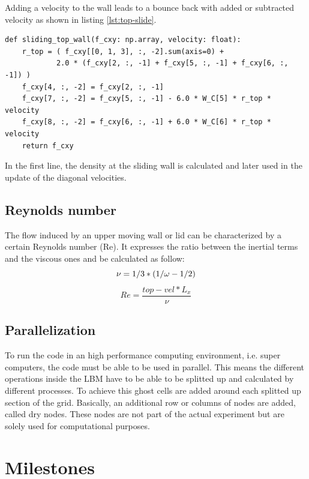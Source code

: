 \documentclass[a4paper,11pt, oneside]{book}
\begin{document}
Adding a velocity to the wall leads to a bounce back with added or subtracted velocity as shown in listing \ref{lst:top-slide}. 
\begin{center}
  \begin{lstlisting}[caption=Bounce back at the top sliding wall.,label=lst:top-slide, basicstyle=\small]
def sliding_top_wall(f_cxy: np.array, velocity: float):
    r_top = ( f_cxy[[0, 1, 3], :, -2].sum(axis=0) + 
            2.0 * (f_cxy[2, :, -1] + f_cxy[5, :, -1] + f_cxy[6, :, -1]) )
    f_cxy[4, :, -2] = f_cxy[2, :, -1]
    f_cxy[7, :, -2] = f_cxy[5, :, -1] - 6.0 * W_C[5] * r_top * velocity
    f_cxy[8, :, -2] = f_cxy[6, :, -1] + 6.0 * W_C[6] * r_top * velocity
    return f_cxy
  \end{lstlisting}
\end{center}
In the first line, the density at the sliding wall is calculated and later used in the update of the diagonal velocities.

\section{Reynolds number}
The flow induced by an upper moving wall or lid can be characterized by a certain Reynolds number (Re).
It expresses the ratio between the inertial terms and the viscous ones and be calculated as follow:
\begin{equation}
    \nu = 1 / 3 * (1 / \omega - 1 / 2) \\
\end{equation}
\begin{equation}
     Re = \frac{top-vel * L_x}{\nu}
\end{equation}


\section{Parallelization}
To run the code in an high performance computing environment, i.e. super computers, the code must be able to be used in parallel.
This means the different operations inside the LBM have to be able to be splitted up and calculated by different processes. 
To achieve this ghost cells are added around each splitted up section of the grid. Basically, an additional row or columns of nodes are added, called dry nodes. These nodes are not part of the actual experiment but are solely used for computational purposes.


\chapter{Milestones}
\end{document}
